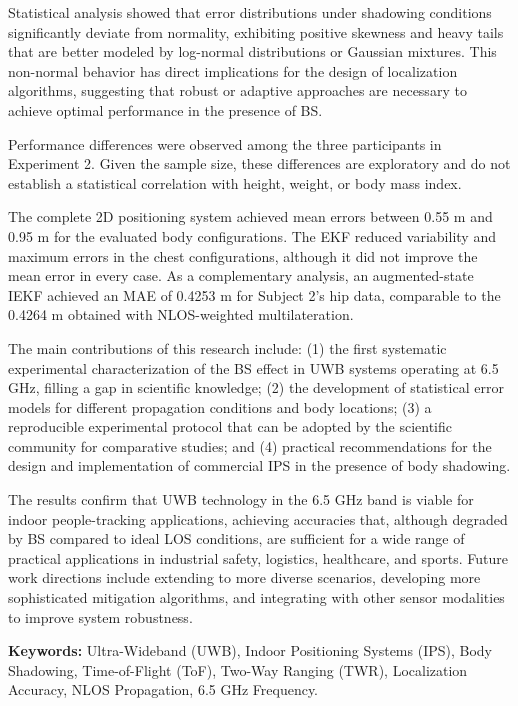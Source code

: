 Statistical analysis showed that error distributions under shadowing conditions significantly deviate from normality, exhibiting positive skewness and heavy tails that are better modeled by log-normal distributions or Gaussian mixtures. This non-normal behavior has direct implications for the design of localization algorithms, suggesting that robust or adaptive approaches are necessary to achieve optimal performance in the presence of BS.

Performance differences were observed among the three participants in Experiment 2. Given the sample size, these differences are exploratory and do not establish a statistical correlation with height, weight, or body mass index.

The complete 2D positioning system achieved mean errors between 0.55 m and 0.95 m for the evaluated body configurations. The EKF reduced variability and maximum errors in the chest configurations, although it did not improve the mean error in every case. As a complementary analysis, an augmented-state IEKF achieved an MAE of 0.4253 m for Subject 2's hip data, comparable to the 0.4264 m obtained with NLOS-weighted multilateration.

The main contributions of this research include: (1) the first systematic experimental characterization of the BS effect in UWB systems operating at 6.5 GHz, filling a gap in scientific knowledge; (2) the development of statistical error models for different propagation conditions and body locations; (3) a reproducible experimental protocol that can be adopted by the scientific community for comparative studies; and (4) practical recommendations for the design and implementation of commercial IPS in the presence of body shadowing.


The results confirm that UWB technology in the 6.5 GHz band is viable for indoor people-tracking applications, achieving accuracies that, although degraded by BS compared to ideal LOS conditions, are sufficient for a wide range of practical applications in industrial safety, logistics, healthcare, and sports. Future work directions include extending to more diverse scenarios, developing more sophisticated mitigation algorithms, and integrating with other sensor modalities to improve system robustness.

\textbf{Keywords:} Ultra-Wideband (UWB), Indoor Positioning Systems (IPS), Body Shadowing, Time-of-Flight (ToF), Two-Way Ranging (TWR), Localization Accuracy, NLOS Propagation, 6.5 GHz Frequency.
